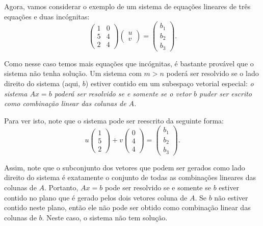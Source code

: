 Agora, vamos considerar o exemplo de um sistema de equações lineares de três equações e duas incógnitas:
\begin{equation*}
   \begin{pmatrix}
      1 & 0\\
      5 & 4\\
      2 & 4
    \end{pmatrix}
    \begin{pmatrix}
      u\\
      v
    \end{pmatrix}
    =
    \begin{pmatrix}
      b_1\\
      b_2\\
      b_3
    \end{pmatrix}.
\end{equation*}

Como nesse caso temos mais equações que incógnitas, é bastante provável que o sistema não tenha solução. Um sistema com $m>n$ poderá ser resolvido se o lado direito do sistema (aqui, $b$) estiver contido em um subespaço vetorial especial: \emph{o sistema $Ax=b$ poderá ser resolvido se e somente se o vetor $b$ puder ser escrito como combinação linear das colunas de $A$.} 

Para ver isto, note que o sistema pode ser reescrito da seguinte forma:
\begin{equation*}
  u \begin{pmatrix}
      1\\
      5\\
      2
    \end{pmatrix}
   + v
    \begin{pmatrix}
      0\\
      4\\
      4
    \end{pmatrix}
    = 
    \begin{pmatrix}
      b_1\\
      b_2\\
      b_3
    \end{pmatrix}.
\end{equation*}

Assim, note que o subconjunto dos vetores que podem ser gerados como lado direito do sistema é exatamente o conjunto de todas as combinações lineares das colunas de $A$. Portanto, $Ax=b$ pode ser resolvido se e somente se $b$ estiver contido no plano que é gerado pelos dois vetores coluna de $A$. Se $b$ não estiver contido neste plano, então ele não pode ser obtido como combinação linear das colunas de $b$. Neste caso, o sistema não tem solução.


